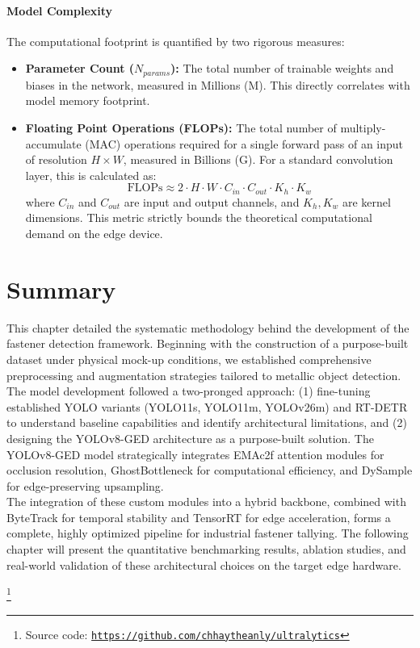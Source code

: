 \paragraph{Model Complexity}
The computational footprint is quantified by two rigorous measures:
\begin{itemize}
    \item \textbf{Parameter Count ($N_{params}$):} The total number of trainable weights and biases in the network, measured in Millions (M). This directly correlates with model memory footprint.
    \item \textbf{Floating Point Operations (FLOPs):} The total number of multiply-accumulate (MAC) operations required for a single forward pass of an input of resolution $H \times W$, measured in Billions (G). For a standard convolution layer, this is calculated as:
    \begin{equation}
        \text{FLOPs} \approx 2 \cdot H \cdot W \cdot C_{in} \cdot C_{out} \cdot K_h \cdot K_w
    \end{equation}
    where $C_{in}$ and $C_{out}$ are input and output channels, and $K_h, K_w$ are kernel dimensions. This metric strictly bounds the theoretical computational demand on the edge device.
\end{itemize}

\section{Summary}
\label{sec:chapter3_summary}

This chapter detailed the systematic methodology behind the development of the fastener detection framework. Beginning with the construction of a purpose-built dataset under physical mock-up conditions, we established comprehensive preprocessing and augmentation strategies tailored to metallic object detection.\\

The model development followed a two-pronged approach: (1) fine-tuning established YOLO variants (YOLO11s, YOLO11m, YOLOv26m) and RT-DETR to understand baseline capabilities and identify architectural limitations, and (2) designing the YOLOv8-GED architecture as a purpose-built solution. The YOLOv8-GED model strategically integrates EMAc2f attention modules for occlusion resolution, GhostBottleneck for computational efficiency, and DySample for edge-preserving upsampling.\\

The integration of these custom modules into a hybrid backbone, combined with ByteTrack for temporal stability and TensorRT for edge acceleration, forms a complete, highly optimized pipeline for industrial fastener tallying. The following chapter will present the quantitative benchmarking results, ablation studies, and real-world validation of these architectural choices on the target edge hardware.

\footnote{\scriptsize Source code: \href{https://github.com/chhaytheanly/ultralytics}{\texttt{https://github.com/chhaytheanly/ultralytics}}}